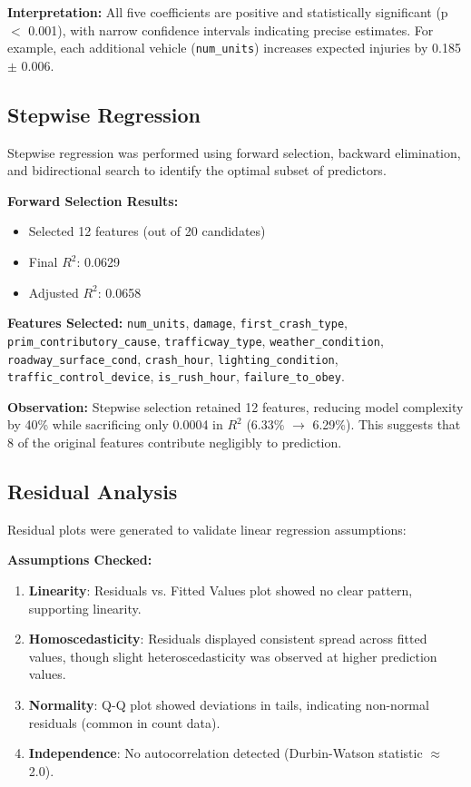 \documentclass[12pt,man]{apa7}
\begin{document}
\textbf{Interpretation:} All five coefficients are positive and statistically significant (p $<$ 0.001), with narrow confidence intervals indicating precise estimates. For example, each additional vehicle (\texttt{num\_units}) increases expected injuries by 0.185 $\pm$ 0.006.

\subsection{Stepwise Regression}

Stepwise regression was performed using forward selection, backward elimination, and bidirectional search to identify the optimal subset of predictors.

\textbf{Forward Selection Results:}
\begin{itemize}
    \item Selected 12 features (out of 20 candidates)
    \item Final $R^2$: 0.0629
    \item Adjusted $R^2$: 0.0658
\end{itemize}

\textbf{Features Selected:} \texttt{num\_units}, \texttt{damage}, \texttt{first\_crash\_type}, \texttt{prim\_contributory\_cause}, \texttt{trafficway\_type}, \texttt{weather\_condition}, \texttt{roadway\_surface\_cond}, \texttt{crash\_hour}, \texttt{lighting\_condition}, \texttt{traffic\_control\_device}, \texttt{is\_rush\_hour}, \texttt{failure\_to\_obey}.

\textbf{Observation:} Stepwise selection retained 12 features, reducing model complexity by 40\% while sacrificing only 0.0004 in $R^2$ (6.33\% $\rightarrow$ 6.29\%). This suggests that 8 of the original features contribute negligibly to prediction.

\subsection{Residual Analysis}

Residual plots were generated to validate linear regression assumptions:

\textbf{Assumptions Checked:}
\begin{enumerate}
    \item \textbf{Linearity}: Residuals vs. Fitted Values plot showed no clear pattern, supporting linearity.
    \item \textbf{Homoscedasticity}: Residuals displayed consistent spread across fitted values, though slight heteroscedasticity was observed at higher prediction values.
    \item \textbf{Normality}: Q-Q plot showed deviations in tails, indicating non-normal residuals (common in count data).
    \item \textbf{Independence}: No autocorrelation detected (Durbin-Watson statistic $\approx$ 2.0).
\end{enumerate}
\end{document}
